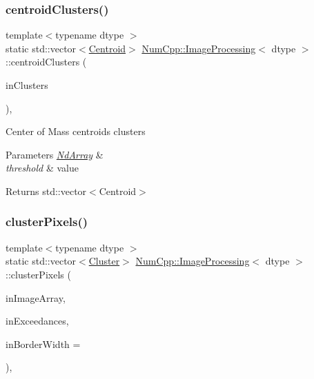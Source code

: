 \subsubsection{\texorpdfstring{centroid\+Clusters()}{centroidClusters()}}
{\footnotesize\ttfamily template$<$typename dtype $>$ \\
static std\+::vector$<$\mbox{\hyperlink{class_num_cpp_1_1_image_processing_1_1_centroid}{Centroid}}$>$ \mbox{\hyperlink{class_num_cpp_1_1_image_processing}{Num\+Cpp\+::\+Image\+Processing}}$<$ dtype $>$\+::centroid\+Clusters (\begin{DoxyParamCaption}\item[{const std\+::vector$<$ \mbox{\hyperlink{class_num_cpp_1_1_image_processing_1_1_cluster}{Cluster}} $>$ \&}]{in\+Clusters }\end{DoxyParamCaption})\hspace{0.3cm}{\ttfamily [inline]}, {\ttfamily [static]}}

Center of Mass centroids clusters


\begin{DoxyParams}{Parameters}
{\em \mbox{\hyperlink{class_num_cpp_1_1_nd_array}{Nd\+Array}}} & \\
\hline
{\em threshold} & value \\
\hline
\end{DoxyParams}
\begin{DoxyReturn}{Returns}
std\+::vector$<$\+Centroid$>$ 
\end{DoxyReturn}
\mbox{\label{class_num_cpp_1_1_image_processing_a80a0f16582065c68c7aa862951ce8cb8}} 
\subsubsection{\texorpdfstring{cluster\+Pixels()}{clusterPixels()}}
{\footnotesize\ttfamily template$<$typename dtype $>$ \\
static std\+::vector$<$\mbox{\hyperlink{class_num_cpp_1_1_image_processing_1_1_cluster}{Cluster}}$>$ \mbox{\hyperlink{class_num_cpp_1_1_image_processing}{Num\+Cpp\+::\+Image\+Processing}}$<$ dtype $>$\+::cluster\+Pixels (\begin{DoxyParamCaption}\item[{const \mbox{\hyperlink{class_num_cpp_1_1_nd_array}{Nd\+Array}}$<$ dtype $>$ \&}]{in\+Image\+Array,  }\item[{const \mbox{\hyperlink{class_num_cpp_1_1_nd_array}{Nd\+Array}}$<$ bool $>$ \&}]{in\+Exceedances,  }\item[{\mbox{\hyperlink{namespace_num_cpp_aee396d0469d6031cd18118c0a45bcdda}{uint8}}}]{in\+Border\+Width = {} }\end{DoxyParamCaption})\hspace{0.3cm}{\ttfamily [inline]}, {\ttfamily [static]}}

